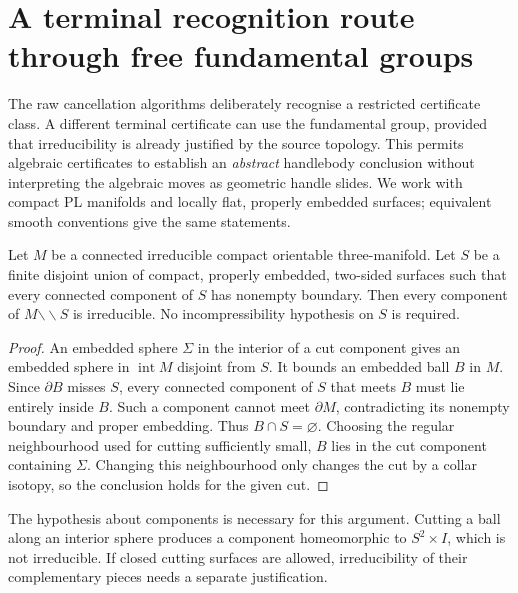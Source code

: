 \section{A terminal recognition route through free fundamental groups}
\label{sec:terminal-free-group}

The raw cancellation algorithms deliberately recognise a restricted
certificate class.  A different terminal certificate can use the
fundamental group, provided that irreducibility is already justified by
the source topology.  This permits algebraic certificates to establish an
\emph{abstract} handlebody conclusion without interpreting the algebraic
moves as geometric handle slides.  We work with compact PL manifolds and
locally flat, properly embedded surfaces; equivalent smooth conventions
give the same statements.

\begin{lemma}
\label{lem:proper-cut-irreducible}
Let $M$ be a connected irreducible compact orientable three-manifold.  Let $S$ be a
finite disjoint union of compact, properly embedded, two-sided surfaces
such that every connected component of $S$ has nonempty boundary.  Then
every component of $M\mathbin{\backslash\!\backslash}S$ is irreducible.
No incompressibility hypothesis on $S$ is required.
\end{lemma}
\begin{proof}
An embedded sphere $\Sigma$ in the interior of a cut component gives an
embedded sphere in $\operatorname{int}M$ disjoint from $S$.  It bounds an
embedded ball $B$ in $M$.  Since $\partial B$ misses $S$, every connected
component of $S$ that meets $B$ must lie entirely inside $B$.  Such a
component cannot meet $\partial M$, contradicting its nonempty boundary
and proper embedding.  Thus $B\cap S=\varnothing$.  Choosing the regular
neighbourhood used for cutting sufficiently small, $B$ lies in the cut
component containing $\Sigma$.  Changing this neighbourhood only changes
the cut by a collar isotopy, so the conclusion holds for the given cut.
\end{proof}

The hypothesis about components is necessary for this argument.  Cutting
a ball along an interior sphere produces a component homeomorphic to
$S^2\times I$, which is not irreducible.  If closed cutting surfaces are
allowed, irreducibility of their complementary pieces needs a separate
justification.

